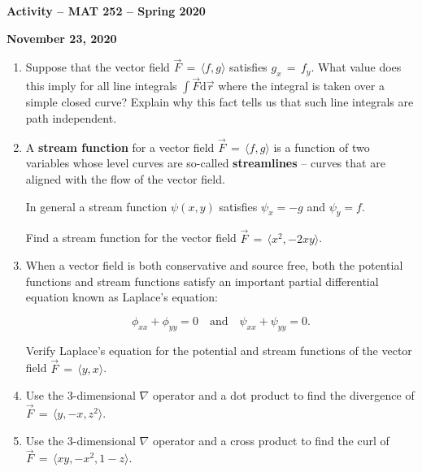 \documentclass{amsart}
\begin{document}
\thispagestyle{empty}

\centerline{\Large \bf Activity -- MAT 252 -- Spring 2020}
\bigskip
\centerline{\large \bf November 23, 2020}

\Large




\begin{enumerate}

\item Suppose that the vector field $\vec{F} \, = \, \langle f, g \rangle$ satisfies $g_x \, = \, f_y$.  What value does this imply for all line integrals $\int \vec{F} \mbox{d}\vec{r}$ where the integral is taken over a simple closed curve?  Explain why this fact tells us that such line integrals are path independent.

\vfill

\newpage

\item A {\bf stream function} for a vector field $\vec{F} \, = \, \langle f, g \rangle$ is a function of two variables whose level curves are so-called {\bf streamlines} -- curves that are aligned with the flow of the vector field.

In general a stream function $\psi(x,y)$ satisfies $\psi_x = -g$ and $\psi_y = f$.  

Find a stream function for the vector field $\vec{F} \, = \, \langle x^2, -2xy \rangle$.

\vfill

\item When a vector field is both conservative and source free, both the potential functions and stream functions satisfy an important partial differential equation known as Laplace's equation:

\[ \phi_{xx} + \phi_{yy} = 0 \quad \mbox{and} \quad  \psi_{xx} + \psi_{yy} = 0.  \]

Verify Laplace's equation for the potential and stream functions of the vector field $\vec{F} \, = \, \langle y, x \rangle$.

\vfill

\newpage

\item Use the 3-dimensional $\nabla$ operator and a dot product to find the divergence of $\vec{F} \, = \, \langle y, -x, z^2 \rangle$.

\vfill

\item Use the 3-dimensional $\nabla$ operator and a cross product to find the curl of $\vec{F} \, = \, \langle xy, -x^2, 1-z \rangle$.


\end{enumerate}
\end{document}

